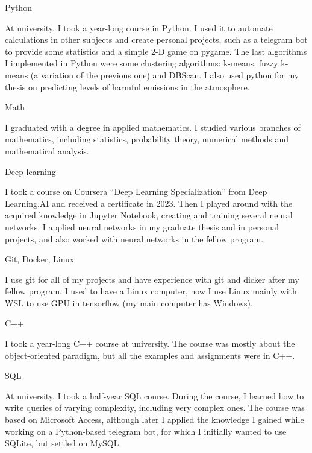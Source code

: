 \documentclass[10pt, letterpaper]{article}
\begin{document}
            
        \begin{onecolentry}
            \begin{highlightsforbulletentries}


            \item Python

            At university, I took a year-long course in Python. 
            I used it to automate calculations in other subjects and create personal projects, such as a telegram bot to provide some statistics and a simple 2-D game on pygame. 
            The last algorithms I implemented in Python were some clustering algorithms: k-means, fuzzy k-means (a variation of the previous one) and DBScan. 
            I also used python for my thesis on predicting levels of harmful emissions in the atmosphere.


            \item Math
            

            I graduated with a degree in applied mathematics. 
            I studied various branches of mathematics, including statistics, probability theory, numerical methods and mathematical analysis.


            \item Deep learning
            

            I took a course on Coursera “Deep Learning Specialization” from Deep Learning.AI and received a certificate in 2023.
            Then I played around with the acquired knowledge in Jupyter Notebook, creating and training several neural networks.
            I applied neural networks in my graduate thesis and in personal projects, and also worked with neural networks in the fellow program.

            \item Git, Docker, Linux
            

            I use git for all of my projects and have experience with git and dicker after my fellow program.
            I used to have a Linux computer, now I use Linux mainly with WSL to use GPU in tensorflow (my main computer has Windows).
            
            
            \item C++
            

            I took a year-long C++ course at university. 
            The course was mostly about the object-oriented paradigm, but all the examples and assignments were in C++.


            \item SQL
            

            At university, I took a half-year SQL course. 
            During the course, I learned how to write queries of varying complexity, including very complex ones. 
            The course was based on Microsoft Access, although later I applied the knowledge I gained while working on a Python-based telegram bot, for which I initially wanted to use SQLite, but settled on MySQL.
            

            \end{highlightsforbulletentries}
        \end{onecolentry}
\end{document}

